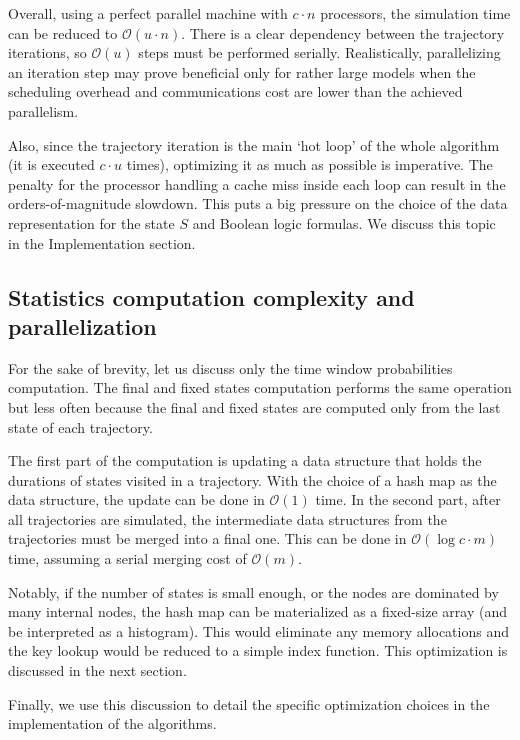\documentclass[times, twoside]{zHenriquesLab-StyleBioRxiv}
\begin{document}
Overall, using a perfect parallel machine with $c \cdot n$ processors, the simulation time can be reduced to $\mathcal{O}(u \cdot n)$. There is a clear dependency between the trajectory iterations, so $\mathcal{O}(u)$ steps must be performed serially. Realistically, parallelizing an iteration step may prove beneficial only for rather large models when the scheduling overhead and communications cost are lower than the achieved parallelism.

Also, since the trajectory iteration is the main `hot loop' of the whole algorithm (it is executed $c \cdot u$ times), optimizing it as much as possible is imperative. The penalty for the processor handling a cache miss inside each loop can result in the orders-of-magnitude slowdown. This puts a big pressure on the choice of the data representation for the state $S$ and Boolean logic formulas. We discuss this topic in the Implementation section. 

\subsection*{Statistics computation complexity and parallelization}

For the sake of brevity, let us discuss only the time window probabilities computation. The final and fixed states computation performs the same operation but less often because the final and fixed states are computed only from the last state of each trajectory.

The first part of the computation is updating a data structure that holds the durations of states visited in a trajectory. With the choice of a hash map as the data structure, the update can be done in $\mathcal{O}(1)$ time. In the second part, after all trajectories are simulated, the intermediate data structures from the trajectories must be merged into a final one. This can be done in $\mathcal{O}(\log{c} \cdot m)$ time, assuming a serial merging cost of $\mathcal{O}(m)$.

Notably, if the number of states is small enough, or the nodes are dominated by many internal nodes, the hash map can be materialized as a fixed-size array (and be interpreted as a histogram). This would eliminate any memory allocations and the key lookup would be reduced to a simple index function. This optimization is discussed in the next section.

Finally, we use this discussion to detail the specific optimization choices in the implementation of the algorithms.
\end{document}
